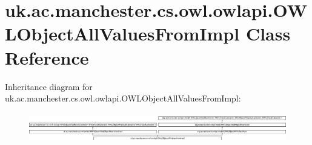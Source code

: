 \hypertarget{classuk_1_1ac_1_1manchester_1_1cs_1_1owl_1_1owlapi_1_1_o_w_l_object_all_values_from_impl}{\section{uk.\-ac.\-manchester.\-cs.\-owl.\-owlapi.\-O\-W\-L\-Object\-All\-Values\-From\-Impl Class Reference}
\label{classuk_1_1ac_1_1manchester_1_1cs_1_1owl_1_1owlapi_1_1_o_w_l_object_all_values_from_impl}
}
Inheritance diagram for uk.\-ac.\-manchester.\-cs.\-owl.\-owlapi.\-O\-W\-L\-Object\-All\-Values\-From\-Impl\-:\begin{figure}[H]
\begin{center}
\leavevmode
\includegraphics[height=1.328588cm]{classuk_1_1ac_1_1manchester_1_1cs_1_1owl_1_1owlapi_1_1_o_w_l_object_all_values_from_impl}
\end{center}
\end{figure}
